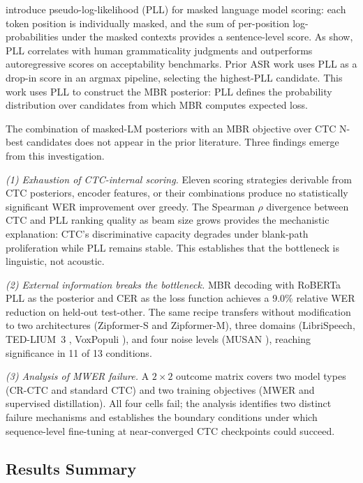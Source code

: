 \citet{salazar2020pll} introduce pseudo-log-likelihood (PLL) for masked language model scoring: each token position is individually masked, and the sum of per-position log-probabilities under the masked contexts provides a sentence-level score. As \citet{salazar2020pll} show, PLL correlates with human grammaticality judgments and outperforms autoregressive scores on acceptability benchmarks. Prior ASR work uses PLL as a drop-in score in an argmax pipeline, selecting the highest-PLL candidate. This work uses PLL to construct the MBR posterior: PLL defines the probability distribution over candidates from which MBR computes expected loss.

The combination of masked-LM posteriors with an MBR objective over CTC N-best candidates does not appear in the prior literature. Three findings emerge from this investigation.

\textit{(1) Exhaustion of CTC-internal scoring.} Eleven scoring strategies derivable from CTC posteriors, encoder features, or their combinations produce no statistically significant WER improvement over greedy. The Spearman $\rho$ divergence between CTC and PLL ranking quality as beam size grows provides the mechanistic explanation: CTC's discriminative capacity degrades under blank-path proliferation while PLL remains stable. This establishes that the bottleneck is linguistic, not acoustic.

\textit{(2) External information breaks the bottleneck.} MBR decoding with RoBERTa \cite{liu2019roberta} PLL as the posterior and CER as the loss function achieves a 9.0\% relative WER reduction on held-out test-other. The same recipe transfers without modification to two architectures (Zipformer-S and Zipformer-M), three domains (LibriSpeech, TED-LIUM~3 \cite{hernandez2018tedlium3}, VoxPopuli \cite{wang2021voxpopuli}), and four noise levels (MUSAN \cite{snyder2015musan}), reaching significance in 11 of 13 conditions.

\textit{(3) Analysis of MWER failure.} A $2\times2$ outcome matrix covers two model types (CR-CTC and standard CTC) and two training objectives (MWER and supervised distillation). All four cells fail; the analysis identifies two distinct failure mechanisms and establishes the boundary conditions under which sequence-level fine-tuning at near-converged CTC checkpoints could succeed.



\subsection{Results Summary}

